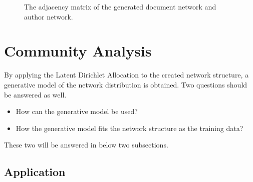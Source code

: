 \documentclass[letterpaper]{article}
\begin{document}
\begin{figure}[ht]
\caption{The adjacency matrix of the generated document network and author network.}
\label{fig:gene_ad_mat}
\end{figure}

\section{Community Analysis}

By applying the Latent Dirichlet Allocation to the created network structure, a generative model of the network distribution is obtained.
Two questions should be answered as well.
\begin{itemize}
\item How can the generative model be used?
\item How the generative model fits the network structure as the training data?
\end{itemize}
These two will be answered in below two subsections.

\subsection{Application}
\end{document}
